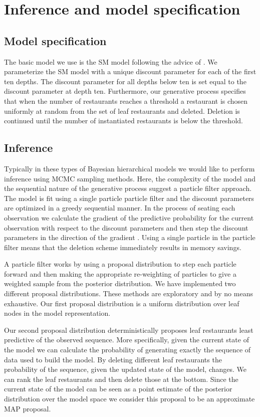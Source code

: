 \section{Inference and model specification}
\label{inference}

\subsection{Model specification}

The basic model we use is the SM model following the advice of \cite{Gasthaus}.  We parameterize the SM model with a unique discount parameter for each of the first ten depths.  The discount parameter for all depths below ten is set equal to the discount parameter at depth ten.  Furthermore, our generative process specifies that when the number of restaurants reaches a threshold a restaurant is chosen uniformly at random from the set of leaf restaurants and deleted.  Deletion is continued until the number of instantiated restaurants is below the threshold.

\subsection{Inference}

Typically in these types of Bayesian hierarchical models we would like to perform inference using MCMC sampling methods.  Here, the complexity of the model and the sequential nature of the generative process suggest a particle filter approach. The model is fit using a single particle particle filter and the discount parameters are optimized in a greedy sequential manner.  In the process of seating each observation we calculate the gradient of the predictive probability for the current observation with respect to the discount parameters and then step the discount parameters in the direction of the gradient \cite{Gasthaus}.  Using a single particle in the particle filter means that the deletion scheme immediately results in memory savings.

A particle filter works by using a proposal distribution to step each particle forward and then making the appropriate re-weighting of particles to give a weighted sample from the posterior distribution. We have implemented two different proposal distributions.  These methods are exploratory and by no means exhaustive.  Our first proposal distribution is a uniform distribution over leaf nodes in the model representation.  

Our second proposal distribution deterministically proposes leaf restaurants least predictive of the observed sequence. More specifically, given the current state of the model we can calculate the probability of generating exactly the sequence of data used to build the model.  By deleting different leaf restaurants the probability of the sequence, given the updated state of the model, changes.  We can rank the leaf restaurants and then delete those at the bottom.  Since the current state of the model can be seen as a point estimate of the posterior distribution over the model space we consider this proposal to be an approximate MAP proposal.

